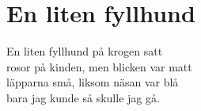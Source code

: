 \section{En liten fyllhund}
En liten fyllhund på krogen satt\\
rosor på kinden, men blicken var matt\\
läpparna små, liksom näsan var blå\\
bara jag kunde så skulle jag gå.\\